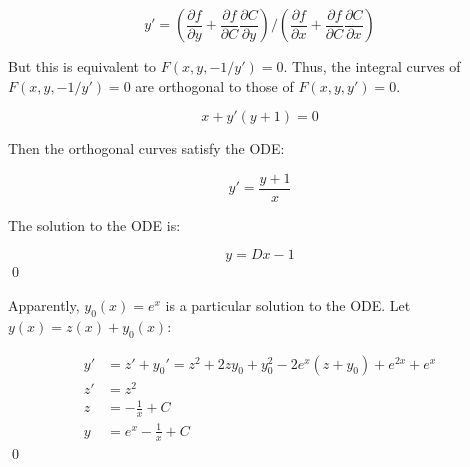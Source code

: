 \documentclass[12pt]{article}
\begin{document}
\begin{equation}
    y' = \left( \frac{\partial f}{\partial y} + \frac{\partial f}{\partial C} \frac{\partial C}{\partial y} \right) / \left( \frac{\partial f}{\partial x} + \frac{\partial f}{\partial C} \frac{\partial C}{\partial x} \right)
\end{equation}

But this is equivalent to $F(x, y, -1/y') = 0$. Thus, the integral curves of $F(x, y, -1/y') = 0$ are orthogonal to those of $F(x, y, y') = 0$.


\begin{equation}
    x + y'(y + 1) = 0
\end{equation}

Then the orthogonal curves satisfy the ODE:

\begin{equation}
    y' = \frac{y + 1}{x}
\end{equation}

The solution to the ODE is:

\begin{equation}
    y = Dx - 1
\end{equation}
\qed



Apparently, $y_{0}(x) = e^{x}$ is a particular solution to the ODE. Let $y(x) = z(x) + y_{0}(x)$:

\begin{equation}
    \begin{split}
        y' &= z' + y_{0}' = z^{2} + 2z y_{0} + y_{0}^{2} - 2e^{x}(z + y_{0}) + e^{2x} + e^{x} \\
        z' &= z^{2} \\
        z &= -\frac{1}{x} + C \\
        y &= e^{x} - \frac{1}{x} + C
    \end{split}
\end{equation}
\qed
\end{document}

